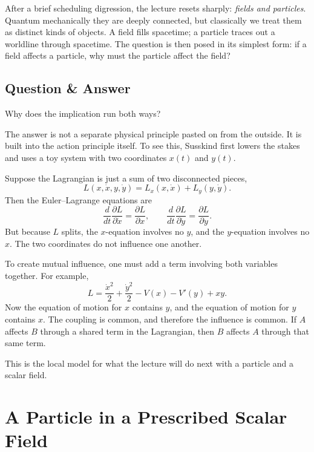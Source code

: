 After a brief scheduling digression, the lecture resets sharply: \emph{fields and particles}. Quantum mechanically they are deeply connected, but classically we treat them as distinct kinds of objects. A field fills spacetime; a particle traces out a worldline through spacetime. The question is then posed in its simplest form: if a field affects a particle, why must the particle affect the field?

\subsection{Question \& Answer}

Why does the implication run both ways?

The answer is not a separate physical principle pasted on from the outside. It is built into the action principle itself. To see this, Susskind first lowers the stakes and uses a toy system with two coordinates \(x(t)\) and \(y(t)\).

Suppose the Lagrangian is just a sum of two disconnected pieces,
\begin{equation}
L(x,\dot x,y,\dot y)=L_x(x,\dot x)+L_y(y,\dot y).
\end{equation}
Then the Euler--Lagrange equations are
\begin{equation}
\frac{d}{dt}\frac{\partial L}{\partial \dot x}=\frac{\partial L}{\partial x},
\qquad
\frac{d}{dt}\frac{\partial L}{\partial \dot y}=\frac{\partial L}{\partial y}.
\end{equation}
But because \(L\) splits, the \(x\)-equation involves no \(y\), and the \(y\)-equation involves no \(x\). The two coordinates do not influence one another.

To create mutual influence, one must add a term involving both variables together. For example,
\begin{equation}
L=\frac{\dot x^2}{2}+\frac{\dot y^2}{2}-V(x)-V'(y)+xy.
\end{equation}
Now the equation of motion for \(x\) contains \(y\), and the equation of motion for \(y\) contains \(x\). The coupling is common, and therefore the influence is common. If \(A\) affects \(B\) through a shared term in the Lagrangian, then \(B\) affects \(A\) through that same term.

This is the local model for what the lecture will do next with a particle and a scalar field.

\section{A Particle in a Prescribed Scalar Field}

